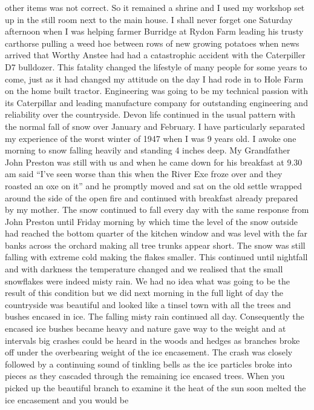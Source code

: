 other items was not correct. So it remained a shrine and I used my workshop set
up in the still room next to the main house. I shall never forget one Saturday
afternoon when I was helping farmer Burridge at Rydon Farm leading his trusty
carthorse pulling a weed hoe between rows of new growing potatoes when news
arrived that Worthy Anstee had had a catastrophic accident with the Caterpiller
D7 bulldozer. This fatality changed the lifestyle of many people for some years
to come, just as it had changed my attitude on the day I had rode in to Hole
Farm on the home built tractor. Engineering was going to be my technical
passion with its Caterpillar and leading manufacture company for outstanding
engineering and reliability over the countryside. Devon life continued in the
usual pattern with the normal fall of snow over January and February. I have
particularly separated my experience of the worst winter of 1947 when I was 9
years old. I awoke one morning to snow falling heavily and standing 4 inches
deep. My Grandfather John Preston was still with us and when he came down for
his breakfast at 9.30 am said ``I've seen worse than this when the River Exe
froze over and they roasted an oxe on it'' and he promptly moved and sat on the
old settle wrapped around the side of the open fire and continued with
breakfast already prepared by my mother. The snow continued to fall every day
with the same response from John Preston until Friday morning by which time the
level of the snow outside had reached the bottom quarter of the kitchen window
and was level with the far banks across the orchard making all tree trunks
appear short. The snow was still falling with extreme cold making the flakes
smaller. This continued until nightfall and with darkness the temperature
changed and we realised that the small snowflakes were indeed misty rain. We
had no idea what was going to be the result of this condition but we did next
morning in the full light of day the countryside was beautiful and looked like
a tinsel town with all the trees and bushes encased in ice. The falling misty
rain continued all day. Consequently the encased ice bushes became heavy and
nature gave way to the weight and at intervals big crashes could be heard in
the woods and hedges as branches broke off under the overbearing weight of the
ice encasement. The crash was closely followed by a continuing sound of
tinkling bells as the ice particles broke into pieces as they cascaded through
the remaining ice encased trees. When you picked up the beautiful branch to
examine it the heat of the sun soon melted the ice encasement and you would be
